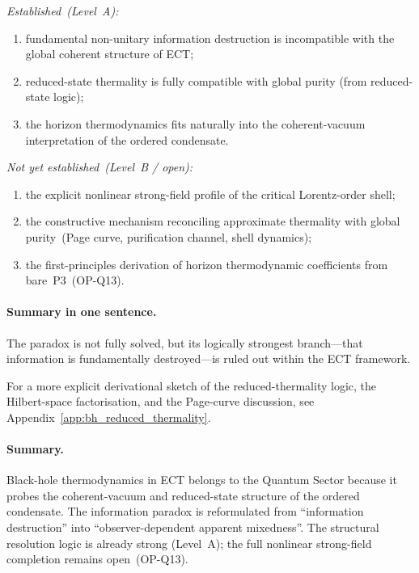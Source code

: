 \textit{Established~(Level~A):}
\begin{enumerate}[label=(\roman*)]
  \item fundamental non-unitary information destruction is
    incompatible with the global coherent structure of ECT;
  \item reduced-state thermality is fully compatible with global
    purity (from reduced-state logic);
  \item the horizon thermodynamics fits naturally into the
    coherent-vacuum interpretation of the ordered condensate.
\end{enumerate}

\textit{Not yet established~(Level~B / open):}
\begin{enumerate}[label=(\roman*)]
  \item the explicit nonlinear strong-field profile of the
    critical Lorentz-order shell;
  \item the constructive mechanism reconciling approximate
    thermality with global purity~(Page curve, purification
    channel, shell dynamics);
  \item the first-principles derivation of horizon thermodynamic
    coefficients from bare~P3~(OP-Q13).
\end{enumerate}

\paragraph{Summary in one sentence.}
The paradox is not fully solved, but its logically strongest
branch---that information is fundamentally destroyed---is ruled
out within the ECT framework.

For a more explicit derivational sketch of the reduced-thermality logic,
the Hilbert-space factorisation, and the Page-curve discussion,
see Appendix~\ref{app:bh_reduced_thermality}.

\paragraph{Summary.}
Black-hole thermodynamics in ECT belongs to the Quantum Sector because
it probes the coherent-vacuum and reduced-state structure of the ordered
condensate.
The information paradox is reformulated from ``information destruction''
into ``observer-dependent apparent mixedness''.
The structural resolution logic is already strong (Level~A);
the full nonlinear strong-field completion remains open~(OP-Q13).

